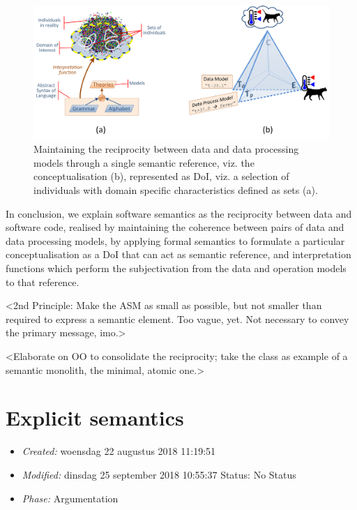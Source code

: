 \documentclass[a4paper,11pt,oneside,oldfontcommands]{memoir}
\theoremstyle{definition}
\theoremstyle{break}		%
\numberwithin{equation}{chapter}
\numberwithin{figure}{chapter}
\begin{document}
\begin{figure}
\hypertarget{fig:single-semantic-reference}{%
\centering
\includegraphics{src/images/SingleSemanticReference.png}
\caption{Maintaining the reciprocity between data and data processing
models through a single semantic reference, viz. the conceptualisation
(b), represented as DoI, viz. a selection of individuals with domain
specific characteristics defined as sets
(a).}\label{fig:single-semantic-reference}
}
\end{figure}

In conclusion, we explain software semantics as the reciprocity between
data and software code, realised by maintaining the coherence between
pairs of data and data processing models, by applying formal semantics
to formulate a particular conceptualisation as a DoI that can act as
semantic reference, and interpretation functions which perform the
subjectivation from the data and operation models to that reference.

\textless{}2nd Principle: Make the ASM as small as possible, but not
smaller than required to express a semantic element. Too vague, yet. Not
necessary to convey the primary message, imo.\textgreater{}

\textless{}Elaborate on OO to consolidate the reciprocity; take the
class as example of a semantic monolith, the minimal, atomic
one.\textgreater{}

\hypertarget{explicit-semantics}{%
\section{Explicit semantics}\label{explicit-semantics}}

\begin{itemize}
\tightlist
\item
  \emph{Created:} woensdag 22 augustus 2018 11:19:51
\item
  \emph{Modified:} dinsdag 25 september 2018 10:55:37 Status: No Status
\item
  \emph{Phase:} Argumentation
\end{itemize}
\end{document}
